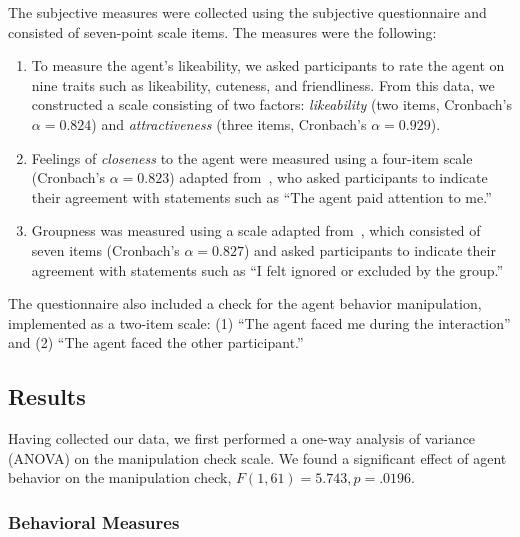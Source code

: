 The subjective measures were collected using the subjective questionnaire and consisted of seven-point scale items. The measures were the following:

\begin{enumerate}
\item To measure the agent's likeability, we asked participants to rate the agent on nine traits such as likeability, cuteness, and friendliness. From this data, we constructed a scale consisting of two factors: \emph{likeability} (two items, Cronbach's $\alpha = 0.824$) and \emph{attractiveness} (three items, Cronbach's $\alpha = 0.929$).
\item Feelings of \emph{closeness} to the agent were measured using a four-item scale (Cronbach's $\alpha = 0.823$) adapted from~\citet{aron1992inclusion}, who asked participants to indicate their agreement with statements such as ``The agent paid attention to me.''
\item Groupness was measured using a scale adapted from~\citet{williams2000cyberostracism}, which consisted of seven items (Cronbach's $\alpha = 0.827$) and asked participants to indicate their agreement with statements such as ``I felt ignored or excluded by the group.''
\end{enumerate}

The questionnaire also included a check for the agent behavior manipulation, implemented as a two-item scale: (1) ``The agent faced me during the interaction'' and (2) ``The agent faced the other participant.''

\subsection{Results}

Having collected our data, we first performed a one-way analysis of variance (ANOVA) on the manipulation check scale. We found a significant effect of agent behavior on the manipulation check, $F(1, 61) = 5.743, p = .0196$.

\subsubsection{Behavioral Measures}

